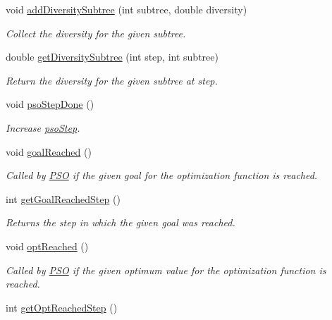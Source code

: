 \begin{CompactItemize}
void \hyperlink{classPsoStatistics_7716ae0c84ec1c5a46410eb3ca8ba61f}{addDiversitySubtree} (int subtree, double diversity)
\begin{CompactList}\small\item\em Collect the diversity for the given subtree. \item\end{CompactList}\item 
double \hyperlink{classPsoStatistics_f67cf355e48366ad9dcd5c0a08f42d87}{getDiversitySubtree} (int step, int subtree)
\begin{CompactList}\small\item\em Return the diversity for the given subtree at step. \item\end{CompactList}\item 
void \hyperlink{classPsoStatistics_6eeabeed3d61750743e14c6edadffd6d}{psoStepDone} ()
\begin{CompactList}\small\item\em Increase \hyperlink{classPsoStatistics_6f6a1e27328b88d53224fa45138bb1ef}{psoStep}. \item\end{CompactList}\item 
void \hyperlink{classPsoStatistics_5a4bd7d3c0f620a4441263aa366c7ef9}{goalReached} ()
\begin{CompactList}\small\item\em Called by \hyperlink{classPSO}{PSO} if the given goal for the optimization function is reached. \item\end{CompactList}\item 
int \hyperlink{classPsoStatistics_bef775b48736dda499fdff45c9e047c0}{getGoalReachedStep} ()
\begin{CompactList}\small\item\em Returns the step in which the given goal was reached. \item\end{CompactList}\item 
void \hyperlink{classPsoStatistics_032e6c1d794cf3c6dd083c20d3a6ad17}{optReached} ()
\begin{CompactList}\small\item\em Called by \hyperlink{classPSO}{PSO} if the given optimum value for the optimization function is reached. \item\end{CompactList}\item 
int \hyperlink{classPsoStatistics_eebf5de7f3d5d624caba604747d149c4}{getOptReachedStep} ()

\end{CompactItemize}
